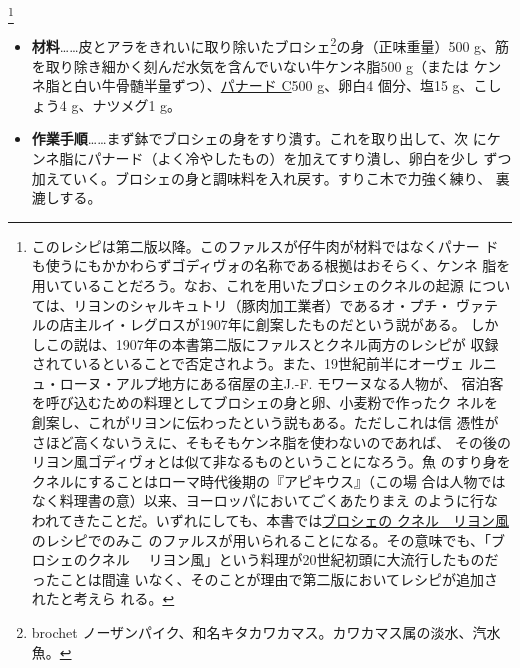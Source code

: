 \begin{recette}
\footnote{このレシピは第二版以降。このファルスが仔牛肉が材料ではなくパナー
  ドも使うにもかかわらずゴディヴォの名称である根拠はおそらく、ケンネ
  脂を用いていることだろう。なお、これを用いたブロシェのクネルの起源
  については、リヨンのシャルキュトリ（豚肉加工業者）であるオ・プチ・
  ヴァテルの店主ルイ・レグロスが1907年に創案したものだという説がある。
  しかしこの説は、1907年の本書第二版にファルスとクネル両方のレシピが
  収録されているといることで否定されよう。また、19世紀前半にオーヴェ
  ルニュ・ローヌ・アルプ地方にある宿屋の主J.-F. モワーヌなる人物が、
  宿泊客を呼び込むための料理としてブロシェの身と卵、小麦粉で作ったク
  ネルを創案し、これがリヨンに伝わったという説もある。ただしこれは信
  憑性がさほど高くないうえに、そもそもケンネ脂を使わないのであれば、
  その後のリヨン風ゴディヴォとは似て非なるものということになろう。魚
  のすり身をクネルにすることはローマ時代後期の『アピキウス』（この場
  合は人物ではなく料理書の意）以来、ヨーロッパにおいてごくあたりまえ
  のように行なわれてきたことだ。いずれにしても、本書では\protect\hyperlink{quenelles-de-brochet-lyonnaise}{ブロシェの
  クネル　リヨン風}のレシピでのみこ
  のファルスが用いられることになる。その意味でも、「ブロシェのクネル
  　リヨン風」という料理が20世紀初頭に大流行したものだったことは間違
  いなく、そのことが理由で第二版においてレシピが追加されたと考えら
  れる。}


\begin{itemize}
\item
  \textbf{材料}\ldots{}\ldots{}皮とアラをきれいに取り除いたブロシェ\footnote{brochet
    ノーザンパイク、和名キタカワカマス。カワカマス属の淡水、汽水魚。}の身（正味重量）500
  g、筋を取り除き細かく刻んだ水気を含んでいない牛ケンネ脂500 g（または
  ケンネ脂と白い牛骨髄半量ずつ）、\protect\hyperlink{panade-c}{パナード
  C}500 g、卵白4 個分、塩15 g、こしょう4 g、ナツメグ1 g。
\item
  \textbf{作業手順}\ldots{}\ldots{}まず鉢でブロシェの身をすり潰す。これを取り出して、次
  にケンネ脂にパナード（よく冷やしたもの）を加えてすり潰し、卵白を少し
  ずつ加えていく。ブロシェの身と調味料を入れ戻す。すりこ木で力強く練り、
  裏漉しする。
\end{itemize}


\end{recette}
